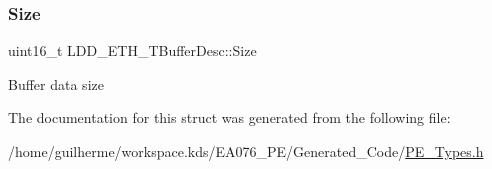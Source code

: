 \subsubsection{\texorpdfstring{Size}{Size}}
{\footnotesize\ttfamily uint16\+\_\+t L\+D\+D\+\_\+\+E\+T\+H\+\_\+\+T\+Buffer\+Desc\+::\+Size}

Buffer data size 

The documentation for this struct was generated from the following file\+:\begin{DoxyCompactItemize}
\item 
/home/guilherme/workspace.\+kds/\+E\+A076\+\_\+\+P\+E/\+Generated\+\_\+\+Code/\hyperlink{_p_e___types_8h}{P\+E\+\_\+\+Types.\+h}\end{DoxyCompactItemize}
